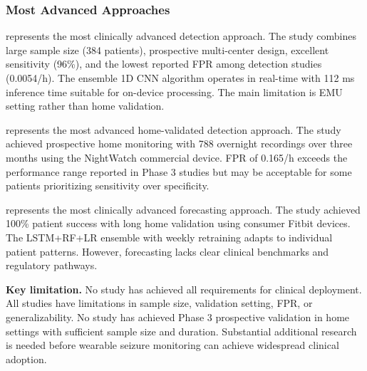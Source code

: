 \subsubsection{Most Advanced Approaches}

\textcite{spahrDeepLearningbasedDetection2025} represents the most clinically advanced detection approach. The study combines large sample size (384 patients), prospective multi-center design, excellent sensitivity (96\%), and the lowest reported FPR among detection studies (0.0054/h). The ensemble 1D CNN algorithm operates in real-time with 112 ms inference time suitable for on-device processing. The main limitation is EMU setting rather than home validation.

\textcite{dongTwoLayerEnsembleMethod2022} represents the most advanced home-validated detection approach. The study achieved prospective home monitoring with 788 overnight recordings over three months using the NightWatch commercial device. FPR of 0.165/h exceeds the performance range reported in Phase 3 studies but may be acceptable for some patients prioritizing sensitivity over specificity.

\textcite{stirlingForecastingSeizureLikelihood2021} represents the most clinically advanced forecasting approach. The study achieved 100\% patient success with long home validation using consumer Fitbit devices. The LSTM+RF+LR ensemble with weekly retraining adapts to individual patient patterns. However, forecasting lacks clear clinical benchmarks and regulatory pathways.

\textbf{Key limitation.} No study has achieved all requirements for clinical deployment. All studies have limitations in sample size, validation setting, FPR, or generalizability. No study has achieved Phase 3 prospective validation in home settings with sufficient sample size and duration. Substantial additional research is needed before wearable seizure monitoring can achieve widespread clinical adoption.
